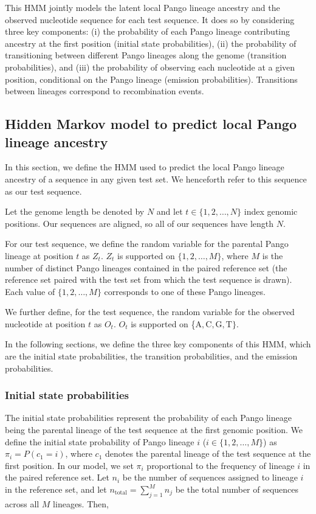 \documentclass[11pt,oneside,letterpaper]{article}
\begin{document}
This HMM jointly models the latent local Pango lineage ancestry and the observed nucleotide sequence for each test sequence. It does so by considering three key components: (i) the probability of each Pango lineage contributing ancestry at the first position (initial state probabilities), (ii) the probability of transitioning between different Pango lineages along the genome (transition probabilities), and (iii) the probability of observing each nucleotide at a given position, conditional on the Pango lineage (emission probabilities). Transitions between lineages correspond to recombination events. 
 
\subsection{Hidden Markov model to predict local Pango lineage ancestry}

In this section, we define the HMM used to predict the local Pango lineage ancestry of a sequence in any given test set. We henceforth refer to this sequence as our test sequence.

Let the genome length be denoted by $N$ and let $t \in \{1, 2, \dots, N\}$ index genomic positions. Our sequences are aligned, so all of our sequences have length $N$.

For our test sequence, we define the random variable for the parental Pango lineage at position $t$ as $Z_t$. $Z_t$ is supported on $\{1, 2, \dots, M\}$, where $M$ is the number of distinct Pango lineages contained in the paired reference set (the reference set paired with the test set from which the test sequence is drawn). Each value of $\{1, 2, \dots, M\}$ corresponds to one of these Pango lineages. 

We further define, for the test sequence, the random variable for the observed nucleotide at position $t$ as $O_t$. $O_t$ is supported on \{$\text{A}, \text{C}, \text{G}, \text{T}\}$.

In the following sections, we define the three key components of this HMM, which are the initial state probabilities, the transition probabilities, and the emission probabilities.

\subsubsection{Initial state probabilities}

The initial state probabilities represent the probability of each Pango lineage being the parental lineage of the test sequence at the first genomic position. We define the initial state probability of Pango lineage $i$ ($i \in \{1, 2, \dots, M\}$) as $\pi_i = P(c_1 = i)$, where $c_1$ denotes the parental lineage of the test sequence at the first position. In our model, we set $\pi_i$ proportional to the frequency of lineage $i$ in the paired reference set. Let $n_i$ be the number of sequences assigned to lineage $i$ in the reference set, and let $n_{\text{total}} = \sum_{j=1}^M n_j$ be the total number of sequences across all $M$ lineages. Then,
\end{document}
